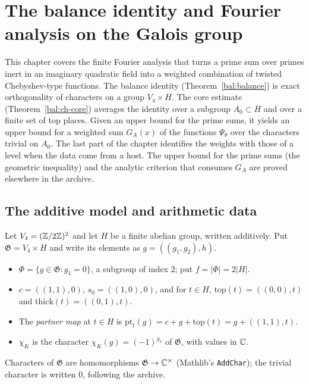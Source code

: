\chapter{The balance identity and Fourier analysis on the Galois group}\label{ch:bal}
This chapter covers the finite Fourier analysis that turns a prime sum over primes inert in an imaginary quadratic field into a weighted combination of twisted Chebyshev-type functions. The balance identity (Theorem~\ref{bal:balance}) is exact orthogonality of characters on a group $V_4\times H$. The core estimate (Theorem~\ref{bal:ch-core}) averages the identity over a subgroup $A_0\subset H$ and over a finite set of top places. Given an upper bound for the prime sums, it yields an upper bound for a weighted sum $G_A(x)$ of the functions $\Psi_{\theta}$ over the characters trivial on $A_0$. The last part of the chapter identifies the weights with those of a level when the data come from a host. The upper bound for the prime sums (the geometric inequality) and the analytic criterion that consumes $G_A$ are proved elsewhere in the archive.

\section{The additive model and arithmetic data}

\begin{definition}\label{bal:additive-model}
Let $V_4=(\mathbb{Z}/2\mathbb{Z})^2$ and let $H$ be a finite abelian group, written additively. Put $\mathfrak G=V_4\times H$ and write its elements as $g=((g_1,g_2),h)$.
\begin{itemize}
\item $\Phi=\{g\in\mathfrak G: g_1=0\}$, a subgroup of index $2$; put $f=|\Phi|=2|H|$.
\item $c=((1,1),0)$, $s_0=((1,0),0)$, and for $t\in H$, $\mathrm{top}(t)=((0,0),t)$ and $\mathrm{thick}(t)=((0,1),t)$.
\item The \emph{partner map} at $t\in H$ is $\mathrm{pt}_t(g)=c+g+\mathrm{top}(t)=g+((1,1),t)$.
\item $\chi_K$ is the character $\chi_K(g)=(-1)^{g_1}$ of $\mathfrak G$, with values in $\mathbb{C}$.
\end{itemize}
Characters of $\mathfrak G$ are homomorphisms $\mathfrak G\to\mathbb{C}^{\times}$ (Mathlib's \texttt{AddChar}); the trivial character is written $0$, following the archive.
\end{definition}

